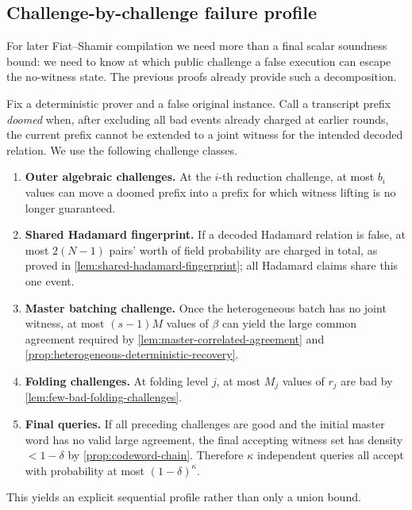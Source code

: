 \subsection{Challenge-by-challenge failure profile}
\label{sec:global-round-profile}

For later Fiat--Shamir compilation we need more than a final scalar soundness bound: we need to know at which public challenge a false execution can escape the no-witness state.  The previous proofs already provide such a decomposition.

Fix a deterministic prover and a false original instance.  Call a transcript prefix \emph{doomed} when, after excluding all bad events already charged at earlier rounds, the current prefix cannot be extended to a joint witness for the intended decoded relation.  We use the following challenge classes.

\begin{enumerate}[label=(\roman*),leftmargin=*]
  \item \textbf{Outer algebraic challenges.}  At the $i$-th reduction challenge, at most $b_i$ values can move a doomed prefix into a prefix for which witness lifting is no longer guaranteed.
  \item \textbf{Shared Hadamard fingerprint.}  If a decoded Hadamard relation is false, at most $2(N-1)$ pairs' worth of field probability are charged in total, as proved in \cref{lem:shared-hadamard-fingerprint}; all Hadamard claims share this one event.
  \item \textbf{Master batching challenge.}  Once the heterogeneous batch has no joint witness, at most $(s-1)M$ values of $\beta$ can yield the large common agreement required by \cref{lem:master-correlated-agreement} and \cref{prop:heterogeneous-deterministic-recovery}.
  \item \textbf{Folding challenges.}  At folding level $j$, at most $M_j$ values of $r_j$ are bad by \cref{lem:few-bad-folding-challenges}.
  \item \textbf{Final queries.}  If all preceding challenges are good and the initial master word has no valid large agreement, the final accepting witness set has density $<1-\delta$ by \cref{prop:codeword-chain}.  Therefore $\kappa$ independent queries all accept with probability at most $(1-\delta)^\kappa$.
\end{enumerate}

This yields an explicit sequential profile rather than only a union bound.


